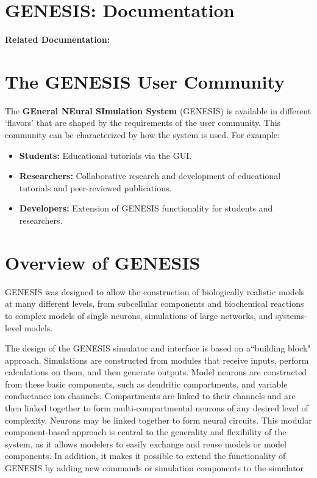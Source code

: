 \documentclass[12pt]{article}
\begin{document}
\section*{GENESIS: Documentation}

{\bf Related Documentation:}

\section*{The GENESIS User Community}

The {\bf GEneral NEural SImulation System} (GENESIS) is available in different `flavors' that are shaped by the requirements of the user community. This community can be characterized by how the system is used. For example:
\begin{itemize}
   \item {\bf Students:} Educational tutorials via the GUI.
   \item {\bf Researchers:} Collaborative research and development of educational tutorials and peer-reviewed publications.
   \item {\bf Developers:} Extension of GENESIS functionality for students and researchers.
\end{itemize}

\section*{Overview of GENESIS}

GENESIS was designed to allow the construction of biologically realistic models at many different levels, from subcellular components and biochemical reactions to complex models of single neurons, simulations of large networks, and systems-level models.

The design of the GENESIS simulator and interface is based on a``building block" approach. Simulations are constructed from modules that receive inputs, perform calculations on them, and then generate outputs. Model neurons are constructed from these basic components, such as dendritic compartments. and variable conductance ion channels. Compartments are linked to their channels and are then linked together to form multi-compartmental neurons of any desired level of complexity. Neurons may be linked together to form neural circuits. This modular component-based approach is central to the generality and flexibility of the system, as it allows modelers to easily exchange and reuse models or model components. In addition, it makes it possible to extend the functionality of GENESIS by adding new commands or simulation components to the simulator
\end{document}
